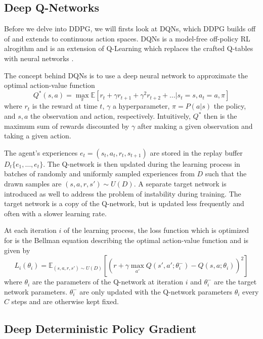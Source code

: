 \subsection{Deep Q-Networks}

Before we delve into DDPG, we will firsts look at DQNs, which DDPG builds off of and extends to continuous action spaces.
DQNs is a model-free off-policy RL alrogithm and is an extension of Q-Learning which replaces the crafted Q-tables with neural networks \cite{watkins1989learning,mnih2015human}.

The concept behind DQNs is to use a deep neural network to approximate the optimal action-value function
\begin{equation}
	Q^* (s, a) = \underset{\pi}{\max} \mathbb{E}\left[r_t + \gamma r_{t+1} + \gamma^2 r_{t+2} + \ldots | s_t=s, a_t=a, \pi\right]
\end{equation}
where $r_t$ is the reward at time $t$, $\gamma$ a hyperparameter, $\pi=P(a|s)$ the policy, and $s, a$ the observation and action, respectively.
Intuitively, $Q^*$ then is the maximum sum of rewards discounted by $\gamma$ after making a given observation and taking a given action.

The agent's experiences $e_t = (s_t, a_t, r_t, s_{t+1})$ are stored in the replay buffer $D_t\{e_1,\ldots,e_t\}$.
The Q-network is then updated during the learning process in batches of randomly and uniformly sampled experiences from $D$ such that the drawn samples are $(s,a,r,s') \sim U(D)$.
A separate target network is introduced as well to address the problem of instability during training.
The target network is a copy of the Q-network, but is updated less frequently and often with a slower learning rate.

At each iteration $i$ of the learning process, the loss function which is optimized for is the Bellman equation describing the optimal action-value function and is given by
\begin{equation}
	L_i(\theta_i) = \mathbb{E}_{(s,a,r,s') \sim U(D)} \left[\left(
		r + \gamma \underset{a'}{\max}Q(s', a'; \theta_i^-) - Q(s,a; \theta_i)
	\right)^2\right]
\end{equation}
where $\theta_i$ are the parameters of the Q-network at iteration $i$ and $\theta_i^-$ are the target network parameters.
$\theta_i^-$ are only updated with the Q-network parameters $\theta_i$ every $C$ steps and are otherwise kept fixed.


\subsection{Deep Deterministic Policy Gradient}

